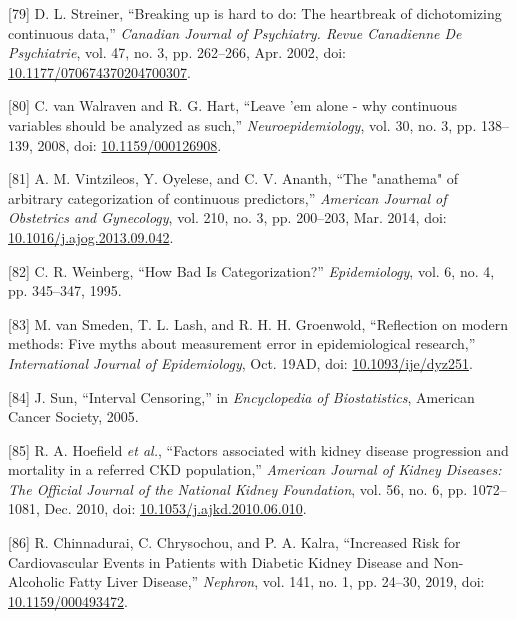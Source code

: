 \documentclass[12pt,PhD,twoside,openright]{muthesis}
\newenvironment{cslreferences}%
  {}%
  {\par}
\begin{document}
\begin{cslreferences}
\leavevmode\hypertarget{ref-streiner_breaking_2002}{}%
{[}79{]} D. L. Streiner, ``Breaking up is hard to do: The heartbreak of dichotomizing continuous data,'' \emph{Canadian Journal of Psychiatry. Revue Canadienne De Psychiatrie}, vol. 47, no. 3, pp. 262--266, Apr. 2002, doi: \href{https://doi.org/10.1177/070674370204700307}{10.1177/070674370204700307}.

\leavevmode\hypertarget{ref-van_walraven_leave_2008}{}%
{[}80{]} C. van Walraven and R. G. Hart, ``Leave 'em alone - why continuous variables should be analyzed as such,'' \emph{Neuroepidemiology}, vol. 30, no. 3, pp. 138--139, 2008, doi: \href{https://doi.org/10.1159/000126908}{10.1159/000126908}.

\leavevmode\hypertarget{ref-vintzileos_anathema_2014}{}%
{[}81{]} A. M. Vintzileos, Y. Oyelese, and C. V. Ananth, ``The "anathema" of arbitrary categorization of continuous predictors,'' \emph{American Journal of Obstetrics and Gynecology}, vol. 210, no. 3, pp. 200--203, Mar. 2014, doi: \href{https://doi.org/10.1016/j.ajog.2013.09.042}{10.1016/j.ajog.2013.09.042}.

\leavevmode\hypertarget{ref-weinberg_how_1995}{}%
{[}82{]} C. R. Weinberg, ``How Bad Is Categorization?'' \emph{Epidemiology}, vol. 6, no. 4, pp. 345--347, 1995.

\leavevmode\hypertarget{ref-van_smeden_reflection_2019}{}%
{[}83{]} M. van Smeden, T. L. Lash, and R. H. H. Groenwold, ``Reflection on modern methods: Five myths about measurement error in epidemiological research,'' \emph{International Journal of Epidemiology}, Oct. 19AD, doi: \href{https://doi.org/10.1093/ije/dyz251}{10.1093/ije/dyz251}.

\leavevmode\hypertarget{ref-sun_interval_2005}{}%
{[}84{]} J. Sun, ``Interval Censoring,'' in \emph{Encyclopedia of Biostatistics}, American Cancer Society, 2005.

\leavevmode\hypertarget{ref-hoefield_factors_2010}{}%
{[}85{]} R. A. Hoefield \emph{et al.}, ``Factors associated with kidney disease progression and mortality in a referred CKD population,'' \emph{American Journal of Kidney Diseases: The Official Journal of the National Kidney Foundation}, vol. 56, no. 6, pp. 1072--1081, Dec. 2010, doi: \href{https://doi.org/10.1053/j.ajkd.2010.06.010}{10.1053/j.ajkd.2010.06.010}.

\leavevmode\hypertarget{ref-chinnadurai_increased_2019-1}{}%
{[}86{]} R. Chinnadurai, C. Chrysochou, and P. A. Kalra, ``Increased Risk for Cardiovascular Events in Patients with Diabetic Kidney Disease and Non-Alcoholic Fatty Liver Disease,'' \emph{Nephron}, vol. 141, no. 1, pp. 24--30, 2019, doi: \href{https://doi.org/10.1159/000493472}{10.1159/000493472}.


\end{cslreferences}
\end{document}
